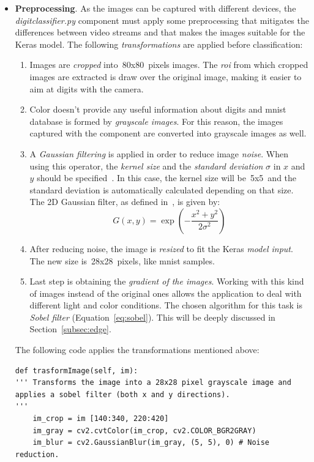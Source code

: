 \begin{itemize}
	\item \textbf{Preprocessing}. As the images can be captured with different devices, the \textit{digitclassifier.py} component must apply some preprocessing that mitigates the differences between video streams and that makes the images suitable for the Keras model. The following \emph{transformations} are applied before classification:
	\begin{enumerate}
		\item Images are \emph{cropped} into~80x80~pixels images. The \emph{\gls{roi}} from which cropped images are extracted is draw over the original image, making it easier to aim at digits with the camera.
		\item Color doesn't provide any useful information about digits and \gls{mnist} database is formed by \emph{grayscale images}. For this reason, the images captured with the component are converted into grayscale images as well. 
		\item A \emph{Gaussian filtering} is applied in order to reduce image \emph{noise}. When using this operator, the \emph{kernel size} and the \emph{standard deviation} $\sigma$ in $x$ and $y$ should be specified~\cite{itseez2014theopencv}. In this case, the kernel size will be~5x5~and the standard deviation is automatically calculated depending on that size. The 2D Gaussian filter, as defined in~\cite{sonka1999image}, is given by:
		\begin{equation}
		G(x,y)=\exp(-\frac{x^2+y^2}{2\sigma^2})
		\end{equation}
		\item After reducing noise, the image is \emph{resized} to fit the Keras \emph{model input}. The new size is~28x28~pixels, like \gls{mnist} samples.
		\item Last step is obtaining the \emph{gradient of the images}. Working with this kind of images instead of the original ones allows the application to deal with different light and color conditions. The chosen algorithm for this task is \emph{Sobel filter} (Equation~\ref{eq:sobel}). This will be deeply discussed in Section~\ref{subsec:edge}.
	\end{enumerate}
	
	The following code applies the transformations mentioned above:
\begin{lstlisting}[frame=single]
def trasformImage(self, im):
''' Transforms the image into a 28x28 pixel grayscale image and
applies a sobel filter (both x and y directions).
''' 
	im_crop = im [140:340, 220:420]
	im_gray = cv2.cvtColor(im_crop, cv2.COLOR_BGR2GRAY)
	im_blur = cv2.GaussianBlur(im_gray, (5, 5), 0) # Noise reduction.
	

\end{lstlisting}
\end{itemize}
